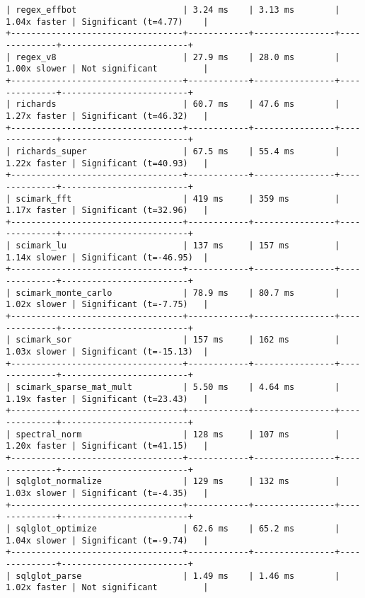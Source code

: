 \begin{code}
\begin{verbatim}
| regex_effbot                     | 3.24 ms    | 3.13 ms        | 1.04x faster | Significant (t=4.77)    |
+----------------------------------+------------+----------------+--------------+-------------------------+
| regex_v8                         | 27.9 ms    | 28.0 ms        | 1.00x slower | Not significant         |
+----------------------------------+------------+----------------+--------------+-------------------------+
| richards                         | 60.7 ms    | 47.6 ms        | 1.27x faster | Significant (t=46.32)   |
+----------------------------------+------------+----------------+--------------+-------------------------+
| richards_super                   | 67.5 ms    | 55.4 ms        | 1.22x faster | Significant (t=40.93)   |
+----------------------------------+------------+----------------+--------------+-------------------------+
| scimark_fft                      | 419 ms     | 359 ms         | 1.17x faster | Significant (t=32.96)   |
+----------------------------------+------------+----------------+--------------+-------------------------+
| scimark_lu                       | 137 ms     | 157 ms         | 1.14x slower | Significant (t=-46.95)  |
+----------------------------------+------------+----------------+--------------+-------------------------+
| scimark_monte_carlo              | 78.9 ms    | 80.7 ms        | 1.02x slower | Significant (t=-7.75)   |
+----------------------------------+------------+----------------+--------------+-------------------------+
| scimark_sor                      | 157 ms     | 162 ms         | 1.03x slower | Significant (t=-15.13)  |
+----------------------------------+------------+----------------+--------------+-------------------------+
| scimark_sparse_mat_mult          | 5.50 ms    | 4.64 ms        | 1.19x faster | Significant (t=23.43)   |
+----------------------------------+------------+----------------+--------------+-------------------------+
| spectral_norm                    | 128 ms     | 107 ms         | 1.20x faster | Significant (t=41.15)   |
+----------------------------------+------------+----------------+--------------+-------------------------+
| sqlglot_normalize                | 129 ms     | 132 ms         | 1.03x slower | Significant (t=-4.35)   |
+----------------------------------+------------+----------------+--------------+-------------------------+
| sqlglot_optimize                 | 62.6 ms    | 65.2 ms        | 1.04x slower | Significant (t=-9.74)   |
+----------------------------------+------------+----------------+--------------+-------------------------+
| sqlglot_parse                    | 1.49 ms    | 1.46 ms        | 1.02x faster | Not significant         |

\end{verbatim}
\end{code}
